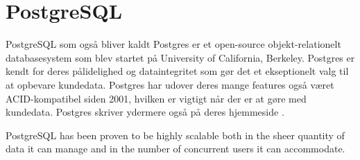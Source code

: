 \section{PostgreSQL}
PostgreSQL som også bliver kaldt Postgres er et open-source objekt-relationelt databasesystem som blev startet på University of California, Berkeley. Postgres er kendt for deres pålidelighed og dataintegritet som gør det et ekseptionelt valg til at opbevare kundedata. Postgres har udover deres mange features også været ACID-kompatibel siden 2001, hvilken er vigtigt når der er at gøre med kundedata. Postgres skriver ydermere også på deres hjemmeside \cite{postgresabout}.
\begin{displayquote}
    PostgreSQL has been proven to be highly scalable both in the sheer quantity of data it can manage and in the number of concurrent users it can accommodate.
\end{displayquote}
